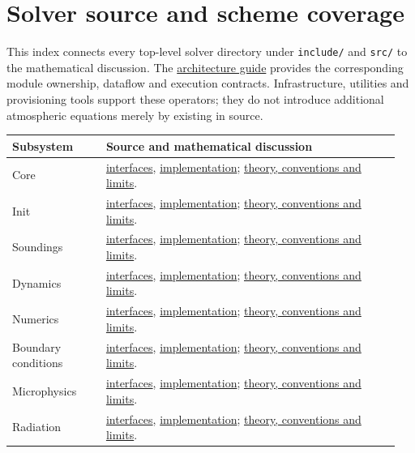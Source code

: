 \chapter{Solver source and scheme coverage}\label{solver-source-coverage}

This index connects every top-level solver directory under
\texttt{include/} and \texttt{src/} to the mathematical discussion.
The \href{ARCHITECTURE.pdf}{architecture guide} provides the corresponding
module ownership, dataflow and execution contracts. Infrastructure,
utilities and provisioning tools support these operators; they do not
introduce additional atmospheric equations merely by existing in source.

\begin{longtable}{@{}p{0.23\linewidth}p{0.72\linewidth}@{}}
\toprule Subsystem & Source and mathematical discussion \\ \midrule
\endhead\bottomrule\endfoot
Core & \href{../include/core}{interfaces}, \href{../src/core}{implementation}; \hyperref[putting-it-together]{theory, conventions and limits}. \\
Init & \href{../include/init}{interfaces}, \href{../src/init}{implementation}; \hyperref[initialization-theory]{theory, conventions and limits}. \\
Soundings & \href{../include/soundings}{interfaces}, \href{../src/soundings}{implementation}; \hyperref[initialization-theory]{theory, conventions and limits}. \\
Dynamics & \href{../include/dynamics}{interfaces}, \href{../src/dynamics}{implementation}; \hyperref[grid-theory]{theory, conventions and limits}. \\
Numerics & \href{../include/numerics}{interfaces}, \href{../src/numerics}{implementation}; \hyperref[grid-theory]{theory, conventions and limits}. \\
Boundary conditions & \href{../include/boundary_conditions}{interfaces}, \href{../src/boundary_conditions}{implementation}; \hyperref[boundaries-complete-the-equations]{theory, conventions and limits}. \\
Microphysics & \href{../include/microphysics}{interfaces}, \href{../src/microphysics}{implementation}; \hyperref[microphysics-theory]{theory, conventions and limits}. \\
Radiation & \href{../include/radiation}{interfaces}, \href{../src/radiation}{implementation}; \hyperref[radiation-theory]{theory, conventions and limits}. \\

\end{longtable}
